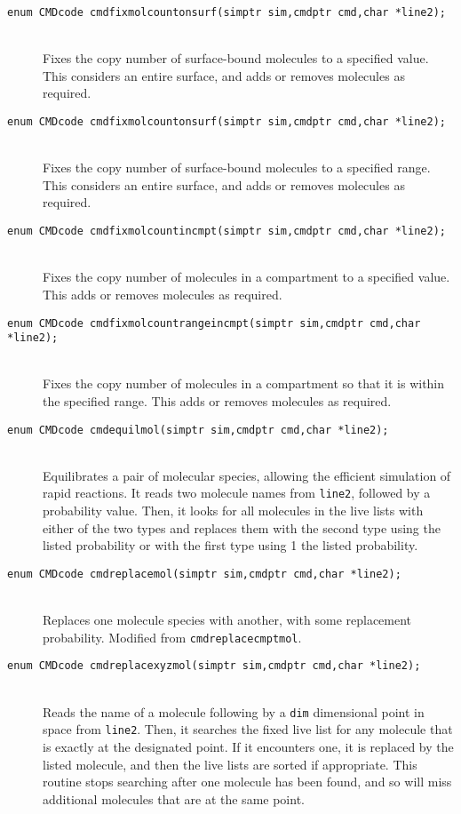\documentclass {scrbook}
\newcommand {\ttt} {\texttt}
\begin{document}
\begin{description}
\item[\ttt{enum CMDcode cmdfixmolcountonsurf(simptr sim,cmdptr cmd,char *line2);}]
\hfill \\
Fixes the copy number of surface-bound molecules to a specified value. This considers an entire surface, and adds or removes molecules as required.

\item[\ttt{enum CMDcode cmdfixmolcountonsurf(simptr sim,cmdptr cmd,char *line2);}]
\hfill \\
Fixes the copy number of surface-bound molecules to a specified range. This considers an entire surface, and adds or removes molecules as required.

\item[\ttt{enum CMDcode cmdfixmolcountincmpt(simptr sim,cmdptr cmd,char *line2);}]
\hfill \\
Fixes the copy number of molecules in a compartment to a specified value. This adds or removes molecules as required.

\item[\ttt{enum CMDcode cmdfixmolcountrangeincmpt(simptr sim,cmdptr cmd,char *line2);}]
\hfill \\
Fixes the copy number of molecules in a compartment so that it is within the specified range. This adds or removes molecules as required.

\item[\ttt{enum CMDcode cmdequilmol(simptr sim,cmdptr cmd,char *line2);}]
\hfill \\
Equilibrates a pair of molecular species, allowing the efficient simulation of rapid reactions. It reads two molecule names from \ttt{line2}, followed by a probability value. Then, it looks for all molecules in the live lists with either of the two types and replaces them with the second type using the listed probability or with the first type using 1 the listed probability.

\item[\ttt{enum CMDcode cmdreplacemol(simptr sim,cmdptr cmd,char *line2);}]
\hfill \\
Replaces one molecule species with another, with some replacement probability. Modified from \ttt{cmdreplacecmptmol}.

\item[\ttt{enum CMDcode cmdreplacexyzmol(simptr sim,cmdptr cmd,char *line2);}]
\hfill \\
Reads the name of a molecule following by a \ttt{dim} dimensional point in space from \ttt{line2}. Then, it searches the fixed live list for any molecule that is exactly at the designated point. If it encounters one, it is replaced by the listed molecule, and then the live lists are sorted if appropriate. This routine stops searching after one molecule has been found, and so will miss additional molecules that are at the same point.


\end{description}
\end{document}
